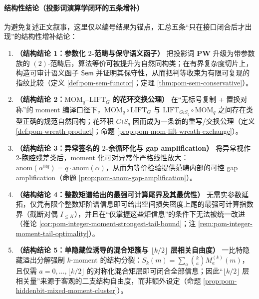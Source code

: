 \paragraph{结构性结论（投影词演算学闭环的五条增补）}
为避免复述正文叙事，这里仅以编号结果为锚点，汇总五条“只在接口闭合后才出现”的结构性增补结论：
\begin{enumerate}
  \item \textbf{（结构结论 1：参数化 \texorpdfstring{$2$}{2}-范畴与保守语义函子）}
  把投影词 \(\mathbf{PW}\) 升级为带参数族的 \((2)\)-范畴后，算法等价可被提升为自然同构类；在有界复杂度切片上，构造可审计语义函子 \(\mathsf{Sem}\) 并证明其保守性，从而把判等收束为有限可复现的指纹比较（定义 \ref{def:pom-sem-functor}；定理 \ref{thm:pom-sem-conservative}）。
  \item \textbf{（结构结论 2：\texorpdfstring{$\mathrm{MOM}_q$}{MOM}--\texorpdfstring{$\mathrm{LIFT}_G$}{LIFT} 的花环交换公理）}
  在“无标号复制 + 置换对称”的 moment 编译口径下，\(\mathrm{MOM}_q\circ\mathrm{LIFT}_G\) 与 \(\mathrm{LIFT}_{G\wr S_q}\circ\mathrm{MOM}_q\) 之间存在类型正确的规范自然同构；花环积 \(G\wr S_q\) 因而成为一条新的重写/交换公理（定义 \ref{def:pom-wreath-product}；命题 \ref{prop:pom-mom-lift-wreath-exchange}）。
  \item \textbf{（结构结论 3：异常签名的 \texorpdfstring{$2$}{2}-余循环化与 gap amplification）}
  将异常视作 \(2\)-胞腔残差类后，moment 化可对异常作严格线性放大：\(\mathrm{anom}(\alpha^{\boxtimes q})=q\cdot\mathrm{anom}(\alpha)\)，从而为等价检验提供范畴内部的可控 gap amplification（命题 \ref{prop:pom-anom-gap-amplification}）。
  \item \textbf{（结构结论 4：整数矩谱给出的最强可计算尾界及其最优性）}
  无需实参数延拓，仅凭有限个整数矩阶谱信息即可给出空间损失密度上尾的最强可计算指数界（截断对偶 \(I_{\le K}\)），并且在“仅掌握这些矩信息”的条件下无法被统一改进（推论 \ref{cor:pom-integer-moment-strongest-tail-bound}；注 \ref{rem:pom-integer-moment-tail-optimality}）。
  \item \textbf{（结构结论 5：单隐藏位诱导的混合矩簇与 \texorpdfstring{$\lfloor k/2\rfloor$}{floor(k/2)} 层相关自由度）}
  一比特隐藏溢出分解强制 \(k\)-moment 的结构分裂：\(S_k(m)=\sum_a\binom{k}{a}M_a^{(k)}(m)\)，且仅需 \(a=0,\dots,\lfloor k/2\rfloor\) 的对称化混合矩层即可闭合全部信息；因此“\(\lfloor k/2\rfloor\) 层相关量”来源于客观的二支结构自由度，而非额外设定（命题 \ref{prop:pom-hiddenbit-mixed-moment-cluster}）。
\end{enumerate}

